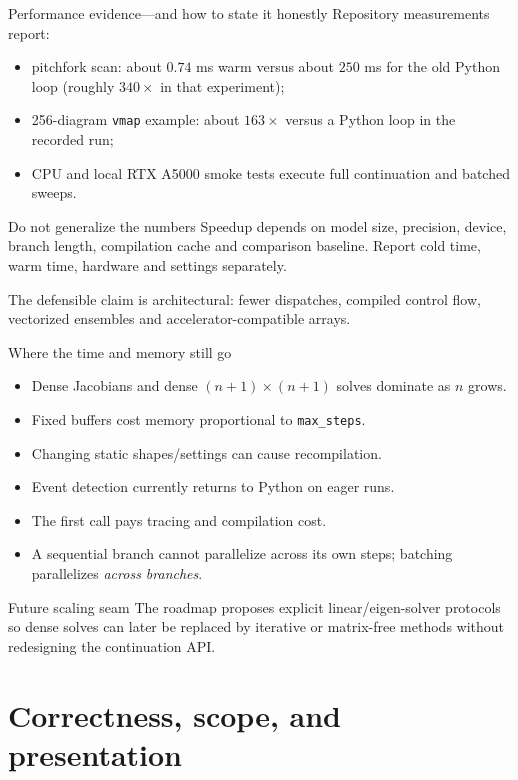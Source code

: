 \documentclass[aspectratio=169,10pt]{beamer}
\begin{document}
\begin{frame}{Performance evidence---and how to state it honestly}
Repository measurements report:
\begin{itemize}
  \item pitchfork scan: about $0.74$ ms warm versus about $250$ ms for the old Python loop (roughly $340\times$ in that experiment);
  \item 256-diagram \texttt{vmap} example: about $163\times$ versus a Python loop in the recorded run;
  \item CPU and local RTX A5000 smoke tests execute full continuation and batched sweeps.
\end{itemize}
\begin{alertblock}{Do not generalize the numbers}
Speedup depends on model size, precision, device, branch length, compilation cache and comparison baseline. Report cold time, warm time, hardware and settings separately.
\end{alertblock}
The defensible claim is architectural: fewer dispatches, compiled control flow, vectorized ensembles and accelerator-compatible arrays.
\end{frame}

\begin{frame}{Where the time and memory still go}
\begin{itemize}
  \item Dense Jacobians and dense $(n+1)\times(n+1)$ solves dominate as $n$ grows.
  \item Fixed buffers cost memory proportional to \texttt{max\_steps}.
  \item Changing static shapes/settings can cause recompilation.
  \item Event detection currently returns to Python on eager runs.
  \item The first call pays tracing and compilation cost.
  \item A sequential branch cannot parallelize across its own steps; batching parallelizes \emph{across branches}.
\end{itemize}
\begin{block}{Future scaling seam}
The roadmap proposes explicit linear/eigen-solver protocols so dense solves can later be replaced by iterative or matrix-free methods without redesigning the continuation API.
\end{block}
\end{frame}

\section{Correctness, scope, and presentation}
\end{document}
